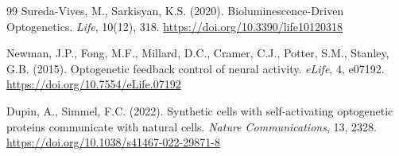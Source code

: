 \documentclass[12pt]{article}
\begin{document}
\begin{thebibliography}{99}
Sureda-Vives, M., Sarkisyan, K.S. (2020).
Bioluminescence-Driven Optogenetics.
\textit{Life}, 10(12), 318.
\url{https://doi.org/10.3390/life10120318}

Newman, J.P., Fong, M.F., Millard, D.C., Cramer, C.J., Potter, S.M., Stanley, G.B. (2015).
Optogenetic feedback control of neural activity.
\textit{eLife}, 4, e07192.
\url{https://doi.org/10.7554/eLife.07192}

Dupin, A., Simmel, F.C. (2022).
Synthetic cells with self-activating optogenetic proteins communicate with natural cells.
\textit{Nature Communications}, 13, 2328.
\url{https://doi.org/10.1038/s41467-022-29871-8}

\end{thebibliography}
\end{document}
